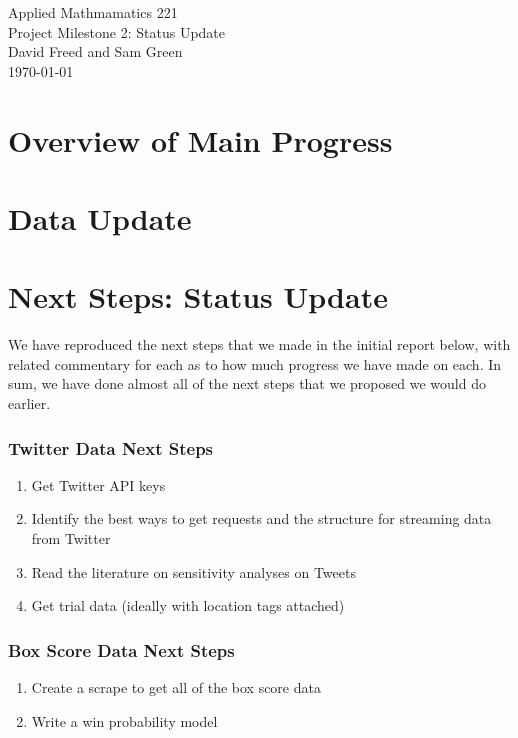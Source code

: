 \documentclass[12pt]{article}
\begin{document}
\begin{center}
{\Large Applied Mathmamatics 221}\\
Project Milestone 2: Status Update\\
David Freed and Sam Green\\
\today
\end{center}

\section*{Overview of Main Progress}



\section*{Data Update}

\section*{Next Steps: Status Update}

We have reproduced the next steps that we made in the initial report below, with related commentary for each as to how much progress we have made on each. In sum, we have done almost all of the next steps that we proposed we would do earlier. 

\subsubsection*{Twitter Data Next Steps}
\begin{enumerate}
	\item Get Twitter API keys
	\item Identify the best ways to get requests and the structure for streaming data from Twitter
	\item Read the literature on sensitivity analyses on Tweets
	\item Get trial data (ideally with location tags attached)
\end{enumerate}

\subsubsection*{Box Score Data Next Steps}
\begin{enumerate}
	\item Create a scrape to get all of the box score data
	\item Write a win probability model
\end{enumerate}
\end{document}
